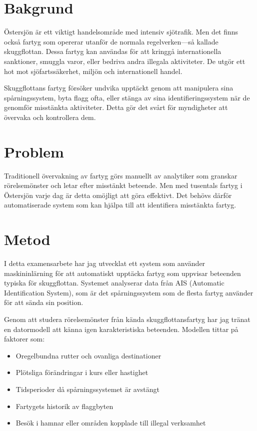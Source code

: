 
\section*{Bakgrund}
Östersjön är ett viktigt handelsområde med intensiv sjötrafik. Men det finns också fartyg som opererar utanför de normala regelverken—så kallade skuggflottan. Dessa fartyg kan användas för att kringgå internationella sanktioner, smuggla varor, eller bedriva andra illegala aktiviteter. De utgör ett hot mot sjöfartssäkerhet, miljön och internationell handel.

Skuggflottans fartyg försöker undvika upptäckt genom att manipulera sina spårningssystem, byta flagg ofta, eller stänga av sina identifieringssystem när de genomför misstänkta aktiviteter. Detta gör det svårt för myndigheter att övervaka och kontrollera dem.

\section*{Problem}
Traditionell övervakning av fartyg görs manuellt av analytiker som granskar rörelsemönster och letar efter misstänkt beteende. Men med tusentals fartyg i Östersjön varje dag är detta omöjligt att göra effektivt. Det behövs därför automatiserade system som kan hjälpa till att identifiera misstänkta fartyg.

\section*{Metod}
I detta examensarbete har jag utvecklat ett system som använder maskininlärning för att automatiskt upptäcka fartyg som uppvisar beteenden typiska för skuggflottan. Systemet analyserar data från AIS (Automatic Identification System), som är det spårningssystem som de flesta fartyg använder för att sända sin position.

Genom att studera rörelsemönster från kända skuggflottansfartyg har jag tränat en datormodell att känna igen karakteristiska beteenden. Modellen tittar på faktorer som:
\begin{itemize}
    \item Oregelbundna rutter och ovanliga destinationer
    \item Plötsliga förändringar i kurs eller hastighet
    \item Tidsperioder då spårningssystemet är avstängt
    \item Fartygets historik av flaggbyten
    \item Besök i hamnar eller områden kopplade till illegal verksamhet
\end{itemize}

